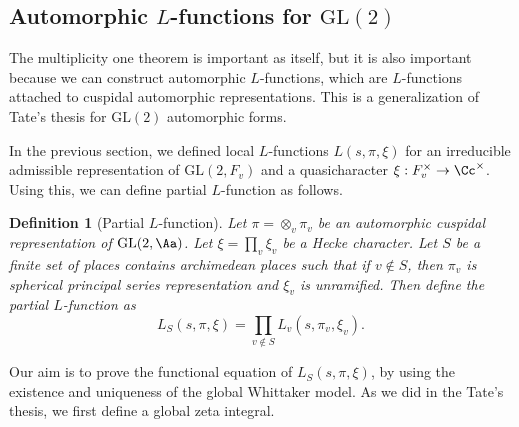 \documentclass{article}
\newtheorem{definition}{Definition}[section]
\newcommand{\GL}{\mathrm{GL}}
\begin{document}
\subsection{Automorphic $L$-functions for $\GL(2)$}

The multiplicity one theorem is important as itself, but it is also important because we can construct automorphic $L$-functions, which are $L$-functions attached to cuspidal automorphic representations. 
This is a generalization of Tate's thesis for  $\GL(2)$ automorphic forms. 

In the previous section, we defined local $L$-functions $L(s, \pi, \xi)$ for an irreducible admissible representation of $\GL(2, F_v)$ and a quasicharacter $\xi:F_v^{\times} \to \Cc^{\times}$. 
Using this, we can define partial $L$-function as follows. 

\begin{comment}
First, we define local $L$-functions for spherical principal series representations. Recall that if $\pi = \otimes_{v} \pi_{v}$ is a cuspidal automorphic representation of $\GL(2)$, then $\pi_{v}$ is spherical for all but finitely many $v$, so is spherical principal series representation since 1-dimensional spherical representations can't admit Whittaker models. 

\begin{definition}[Local $L$-function]
Let $F$ be a non-archimedean local field with a ring of integer $\calO = \calO_{F}$ and a uniformizer $\varpi$. Let $q$ be the cardinality of the residue field $\calO/(\varpi)$ and let $\xi$ be a unramified character of $F^{\times}$. Let $\pi = \pi(\chi_{1}, \chi_{2})$ be a spherical principal series representation of $\GL(2, F)$ associated to unramified characters $\chi_{1}, \chi_{2}$.  
Define the local $L$-function as
$$
L(s, \pi, \xi) = (1-\alpha_{1}\xi(\varpi)q^{-s})^{-1}(1-\alpha_{2}\xi(\varpi)q^{-s})^{-1}
$$
where $\alpha_{i} = \chi_{i}(\varpi)$. 
\end{definition}
By multiply those local $L$-functions, we can define (incomplete) global $L$-function. 
\end{comment}

\begin{definition}[Partial $L$-function]
Let $\pi = \otimes_{v} \pi_{v}$ be an automorphic cuspidal representation of $\GL(2, \Aa)$. 
Let $\xi = \prod_{v}\xi_{v}$ be a Hecke character. 
Let $S$ be a finite set of places contains archimedean places such that if $v\not\in S$, then $\pi_{v}$ is spherical principal series representation and $\xi_{v}$ is unramified. 
Then define the partial $L$-function as
$$
L_{S}(s, \pi, \xi) = \prod_{v\not\in S} L_{v}(s, \pi_{v}, \xi_{v}). 
$$
\end{definition}
Our aim is to prove the functional equation of $L_{S}(s, \pi, \xi)$, by using the existence and uniqueness of the global Whittaker model.  
As we did in the Tate's thesis, we first define a global zeta integral. 
\end{document}

